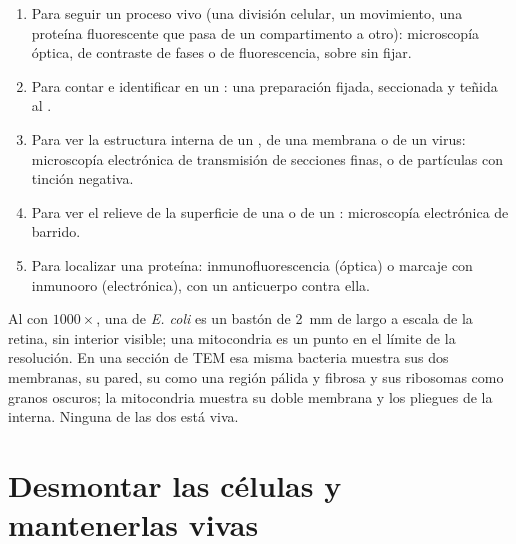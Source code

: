 \begin{method}\label{met:b1:cell-unit-of-life:choose}
\begin{enumerate}
  \item Para seguir un proceso vivo (una división celular, un movimiento,
        una proteína fluorescente que pasa de un compartimento a otro):
        microscopía óptica, de contraste de fases o de fluorescencia, sobre
         sin fijar.
  \item Para contar e identificar  en un : una preparación
        fijada, seccionada y teñida al .
  \item Para ver la estructura interna de un , de una membrana o de
        un virus: microscopía electrónica de transmisión de secciones
        finas, o de partículas con tinción negativa.
  \item Para ver el relieve de la superficie de una  o de un :
        microscopía electrónica de barrido.
  \item Para localizar una proteína: inmunofluorescencia (óptica) o marcaje
        con inmunooro (electrónica), con un anticuerpo contra ella.
\end{enumerate}
\end{method}

\begin{example}\label{ex:b1:cell-unit-of-life:seeing}
Al  con $1000\times$, una  de \emph{E. coli} es un
bastón de \qty{2}{mm} de largo a escala de la retina, sin interior visible;
una mitocondria es un punto en el límite de la resolución. En una sección de
TEM esa misma bacteria muestra sus dos membranas, su pared, su 
como una región pálida y fibrosa y sus ribosomas como granos oscuros; la
mitocondria muestra su doble membrana y los pliegues de la interna. Ninguna
de las dos está viva.
\end{example}

\section{Desmontar las células y mantenerlas vivas}

